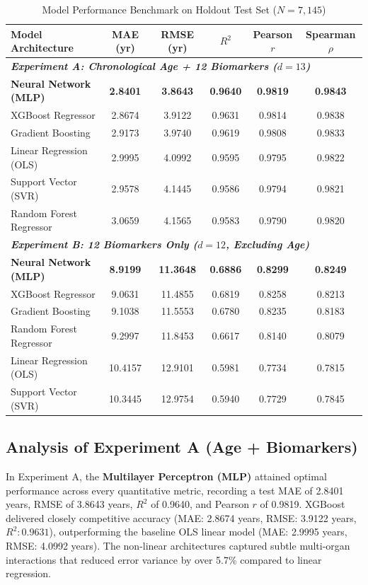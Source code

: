 \documentclass[conference]{IEEEtran}
\begin{document}
\begin{table}[t]
\caption{Model Performance Benchmark on Holdout Test Set ($N = 7,145$)}
\label{tab:benchmark}
\centering
\scriptsize
\begin{tabular}{lccccc}
\toprule
\textbf{Model Architecture} & \textbf{MAE (yr)} & \textbf{RMSE (yr)} & \textbf{$R^2$} & \textbf{Pearson $r$} & \textbf{Spearman $\rho$} \\
\midrule
\multicolumn{6}{l}{\textit{\textbf{Experiment A: Chronological Age + 12 Biomarkers ($d = 13$)}}} \\
\textbf{Neural Network (MLP)} & \textbf{2.8401} & \textbf{3.8643} & \textbf{0.9640} & \textbf{0.9819} & \textbf{0.9843} \\
XGBoost Regressor & 2.8674 & 3.9122 & 0.9631 & 0.9814 & 0.9838 \\
Gradient Boosting & 2.9173 & 3.9740 & 0.9619 & 0.9808 & 0.9833 \\
Linear Regression (OLS) & 2.9995 & 4.0992 & 0.9595 & 0.9795 & 0.9822 \\
Support Vector (SVR) & 2.9578 & 4.1445 & 0.9586 & 0.9794 & 0.9821 \\
Random Forest Regressor & 3.0659 & 4.1565 & 0.9583 & 0.9790 & 0.9820 \\
\midrule
\multicolumn{6}{l}{\textit{\textbf{Experiment B: 12 Biomarkers Only ($d = 12$, Excluding Age)}}} \\
\textbf{Neural Network (MLP)} & \textbf{8.9199} & \textbf{11.3648} & \textbf{0.6886} & \textbf{0.8299} & \textbf{0.8249} \\
XGBoost Regressor & 9.0631 & 11.4855 & 0.6819 & 0.8258 & 0.8213 \\
Gradient Boosting & 9.1038 & 11.5553 & 0.6780 & 0.8235 & 0.8183 \\
Random Forest Regressor & 9.2997 & 11.8453 & 0.6617 & 0.8140 & 0.8079 \\
Linear Regression (OLS) & 10.4157 & 12.9101 & 0.5981 & 0.7734 & 0.7815 \\
Support Vector (SVR) & 10.3445 & 12.9754 & 0.5940 & 0.7729 & 0.7845 \\
\bottomrule
\end{tabular}
\end{table}

\subsection{Analysis of Experiment A (Age + Biomarkers)}
In Experiment A, the \textbf{Multilayer Perceptron (MLP)} attained optimal performance across every quantitative metric, recording a test MAE of 2.8401 years, RMSE of 3.8643 years, $R^2$ of 0.9640, and Pearson $r$ of 0.9819. XGBoost delivered closely competitive accuracy (MAE: 2.8674 years, RMSE: 3.9122 years, $R^2: 0.9631$), outperforming the baseline OLS linear model (MAE: 2.9995 years, RMSE: 4.0992 years). The non-linear architectures captured subtle multi-organ interactions that reduced error variance by over 5.7\% compared to linear regression.
\end{document}

